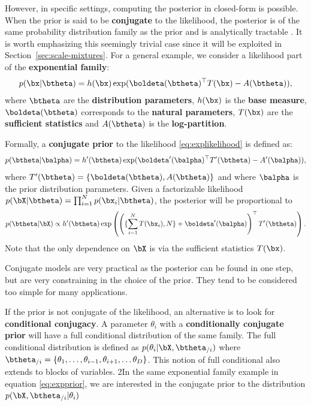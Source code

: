 However, in specific settings, computing the posterior in closed-form is possible.
When the prior is said to be \textbf{conjugate} to the likelihood, the posterior is of the same probability distribution family as the prior and is analytically tractable \cite{schlaifer1961applied}.
It is worth emphasizing this seemingly trivial case since it will be exploited in Section~\ref{sec:scale-mixtures}.
For a general example, we consider a likelihood part of the \textbf{exponential family}:
\begin{align}
    p(\bx|\btheta) = h(\bx)\exp(\boldeta(\btheta)^\top T(\bx) - A(\btheta)),
    \label{eq:explikelihood}
\end{align}
where $\btheta$ are the \textbf{distribution parameters}, $h(\bx)$ is the \textbf{base measure}, $\boldeta(\btheta)$ corresponds to the \textbf{natural parameters}, $T(\bx)$ are the \textbf{sufficient statistics} and $A(\btheta)$ is the \textbf{log-partition}.

Formally, a \textbf{conjugate prior} to the likelihood \eqref{eq:explikelihood} is defined as:
\begin{align}
    p(\btheta|\balpha) = h'(\btheta)\exp(\boldeta'(\balpha)^\top T'(\btheta) - A'(\balpha)),
    \label{eq:expprior}
\end{align}
where $T'(\btheta) = \left\{\boldeta(\btheta), A(\btheta)\right\}$ and where $\balpha$ is the prior distribution parameters.
Given a factorizable likelihood $p(\bX|\btheta) = \prod_{i=1}^N p(\bx_i|\btheta)$, the posterior will be proportional to
\begin{align}
    p(\btheta|\bX) \propto h'(\btheta)\exp\left(\left(\{\sum_{i=1}^N T(\bx_i), N\} + \boldeta'(\balpha)\right)^\top T'(\btheta)\right).\label{eq:posterior}
\end{align}
Note that the only dependence on $\bX$ is via the sufficient statistics $T(\bx)$.

Conjugate models are very practical as the posterior can be found in one step, but are very constraining in the choice of the prior.
They tend to be considered too simple for many applications.

If the prior is not conjugate of the likelihood, an alternative is to look for \textbf{conditional conjugacy}.
A parameter $\theta_i$ with a \textbf{conditionally conjugate prior} will have a full conditional distribution of the same family.
The full conditional distribution is defined as $p(\theta_i|
\bX, \btheta_{/i})$ where $\btheta_{/i} = \{\theta_1, \ldots, \theta_{i-1},\theta_{i+1},\ldots\theta_D\}$.
This notion of full conditional also extends to blocks of variables.
2In the same exponential family example in equation \eqref{eq:expprior}, we are interested in the conjugate prior to the distribution $p(\bX, \btheta_{/i} | \theta_i)$

